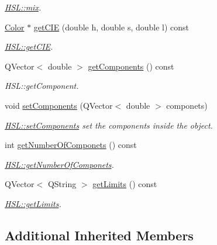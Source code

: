 \begin{DoxyCompactItemize}
\begin{DoxyCompactList}\small\item\em \hyperlink{class_h_s_l_a08bcec2ca6961b7c6431d92a625c30a7}{H\+S\+L\+::mix}. \end{DoxyCompactList}\item 
\hyperlink{class_color}{Color} $\ast$ \hyperlink{class_h_s_l_ad755c96eff0cc73dea69c007d745dd4e}{get\+C\+IE} (double h, double s, double l) const
\begin{DoxyCompactList}\small\item\em \hyperlink{class_h_s_l_ad755c96eff0cc73dea69c007d745dd4e}{H\+S\+L\+::get\+C\+IE}. \end{DoxyCompactList}\item 
Q\+Vector$<$ double $>$ \hyperlink{class_h_s_l_a2de2eb4fa5c9ffcea894f7c6591cb335}{get\+Components} () const
\begin{DoxyCompactList}\small\item\em H\+S\+L\+::get\+Component. \end{DoxyCompactList}\item 
void \hyperlink{class_h_s_l_a101be14729707abca388680610e2fe86}{set\+Components} (Q\+Vector$<$ double $>$ componets)
\begin{DoxyCompactList}\small\item\em \hyperlink{class_h_s_l_a101be14729707abca388680610e2fe86}{H\+S\+L\+::set\+Components} set the components inside the object. \end{DoxyCompactList}\item 
int \hyperlink{class_h_s_l_a6e582f5779c1b5f84abe8bb182a868d0}{get\+Number\+Of\+Componets} () const
\begin{DoxyCompactList}\small\item\em \hyperlink{class_h_s_l_a6e582f5779c1b5f84abe8bb182a868d0}{H\+S\+L\+::get\+Number\+Of\+Componets}. \end{DoxyCompactList}\item 
Q\+Vector$<$ Q\+String $>$ \hyperlink{class_h_s_l_a7ac26d7b7b5755769165455e1b6d3312}{get\+Limits} () const
\begin{DoxyCompactList}\small\item\em \hyperlink{class_h_s_l_a7ac26d7b7b5755769165455e1b6d3312}{H\+S\+L\+::get\+Limits}. \end{DoxyCompactList}\end{DoxyCompactItemize}
\subsection*{Additional Inherited Members}



